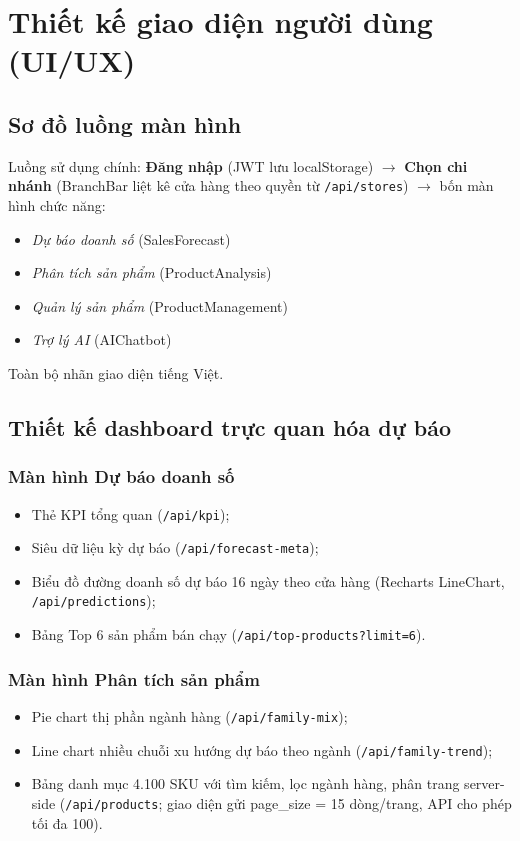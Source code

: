 \documentclass[12pt,a4paper]{report}
\begin{document}
\section{Thiết kế giao diện người dùng (UI/UX)}

\subsection{Sơ đồ luồng màn hình}

Luồng sử dụng chính: \textbf{Đăng nhập} (JWT lưu localStorage) $\rightarrow$ \textbf{Chọn chi nhánh} (BranchBar liệt kê cửa hàng theo quyền từ \texttt{/api/stores}) $\rightarrow$ bốn màn hình chức năng:
\begin{itemize}
    \item \textit{Dự báo doanh số} (SalesForecast)
    \item \textit{Phân tích sản phẩm} (ProductAnalysis)
    \item \textit{Quản lý sản phẩm} (ProductManagement)
    \item \textit{Trợ lý AI} (AIChatbot)
\end{itemize}

Toàn bộ nhãn giao diện tiếng Việt.

\subsection{Thiết kế dashboard trực quan hóa dự báo}

\subsubsection{Màn hình Dự báo doanh số}
\begin{itemize}
    \item Thẻ KPI tổng quan (\texttt{/api/kpi});
    \item Siêu dữ liệu kỳ dự báo (\texttt{/api/forecast-meta});
    \item Biểu đồ đường doanh số dự báo 16 ngày theo cửa hàng (Recharts LineChart, \texttt{/api/predictions});
    \item Bảng Top 6 sản phẩm bán chạy (\texttt{/api/top-products?limit=6}).
\end{itemize}

\subsubsection{Màn hình Phân tích sản phẩm}
\begin{itemize}
    \item Pie chart thị phần ngành hàng (\texttt{/api/family-mix});
    \item Line chart nhiều chuỗi xu hướng dự báo theo ngành (\texttt{/api/family-trend});
    \item Bảng danh mục 4.100 SKU với tìm kiếm, lọc ngành hàng, phân trang server-side (\texttt{/api/products}; giao diện gửi page\_size = 15 dòng/trang, API cho phép tối đa 100).
\end{itemize}
\end{document}

